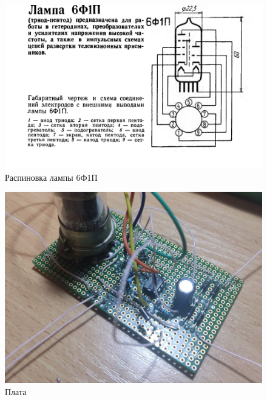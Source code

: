 \begin{figure}[h!p]
    \centering
    \includegraphics[scale=0.55]{image.png}
    \caption{Распиновка лампы 6Ф1П}
    \label{fig:ref_6f1p}
\end{figure}

\begin{figure}[h!p]
    \centering
    \includegraphics[scale=0.35]{photo2.jpg}
    \caption{Плата}
    \label{fig:plata}
\end{figure}

